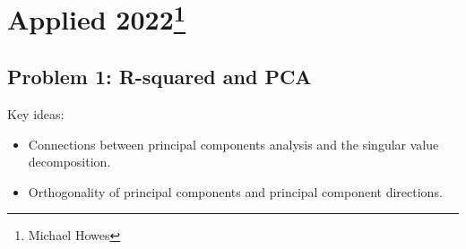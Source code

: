 \section{Applied 2022\footnote{Michael Howes}}

\subsection*{Problem 1: R-squared and PCA}

Key ideas:
\begin{itemize}
    \item Connections between principal components analysis and the singular value decomposition.
    \item Orthogonality of principal components and principal component directions.
\end{itemize}

